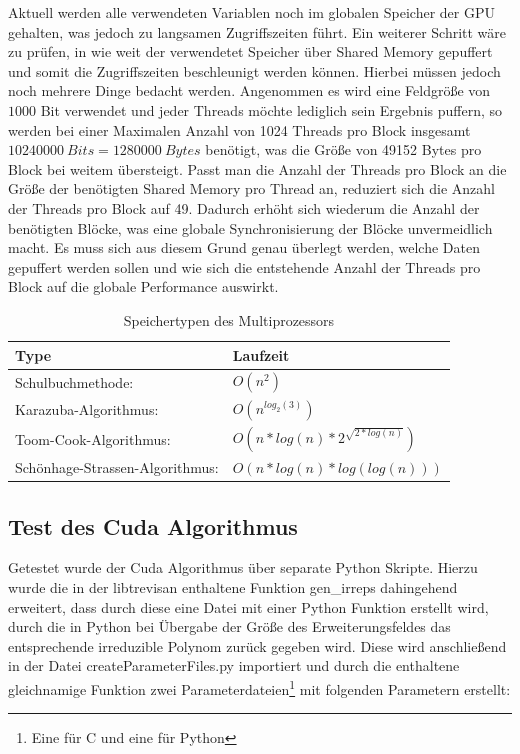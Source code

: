  Aktuell werden alle verwendeten Variablen noch im globalen Speicher der GPU gehalten, was jedoch zu langsamen Zugriffszeiten führt. Ein weiterer Schritt wäre zu prüfen, in wie weit der verwendetet Speicher über Shared Memory gepuffert und somit die Zugriffszeiten beschleunigt werden können. Hierbei müssen jedoch noch mehrere Dinge bedacht werden. Angenommen es wird eine Feldgröße von $1000$ Bit verwendet und jeder Threads möchte lediglich sein Ergebnis puffern, so werden bei einer Maximalen Anzahl von 1024 Threads pro Block insgesamt $10240000\ Bits = 1280000\ Bytes$ benötigt, was die Größe von 49152 Bytes pro Block bei weitem übersteigt. Passt man die Anzahl der Threads pro Block an die Größe der benötigten Shared Memory pro Thread an, reduziert sich die Anzahl der Threads pro Block auf 49. Dadurch erhöht sich wiederum die Anzahl der benötigten Blöcke, was eine globale Synchronisierung der Blöcke unvermeidlich macht. Es muss sich aus diesem Grund genau überlegt werden, welche Daten gepuffert werden sollen und wie sich die entstehende Anzahl der Threads pro Block auf die globale Performance auswirkt.

\begin{table}
\centering
\begin{tabular}{ll}
\hline \hline
Type & Laufzeit \\
\hline
Schulbuchmethode: & $O(n^2)$ \\
Karazuba-Algorithmus: & $O(n^{log_2(3)})$ \\
Toom-Cook-Algorithmus: & $O(n*log(n)*2^{\sqrt{2*log(n)}})$ \\
Schönhage-Strassen-Algorithmus: & $O(n*log(n)*log(log(n)))$ \\
\end{tabular}
\caption{Speichertypen des Multiprozessors}
\label{table:memory}
\end{table}

\subsection{Test des Cuda Algorithmus}
Getestet wurde der Cuda Algorithmus über separate Python Skripte. Hierzu wurde die in der libtrevisan enthaltene Funktion gen\_irreps dahingehend erweitert, dass durch diese eine Datei mit einer Python Funktion erstellt wird, durch die in Python bei Übergabe der Größe des Erweiterungsfeldes das entsprechende irreduzible Polynom zurück gegeben wird. Diese wird anschließend in der Datei createParameterFiles.py importiert und durch die enthaltene gleichnamige Funktion zwei Parameterdateien\footnote{Eine für C und eine für Python} mit folgenden Parametern erstellt:

